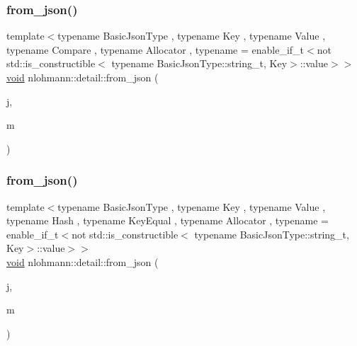 \subsubsection{\texorpdfstring{from\_json()}{from\_json()}\hspace{0.1cm}{\footnotesize\ttfamily [17/18]}}
{\footnotesize\ttfamily template$<$typename Basic\+Json\+Type , typename Key , typename Value , typename Compare , typename Allocator , typename  = enable\+\_\+if\+\_\+t$<$not std\+::is\+\_\+constructible$<$                                     typename Basic\+Json\+Type\+::string\+\_\+t, Key$>$\+::value$>$$>$ \\
\mbox{\hyperlink{namespacenlohmann_1_1detail_a59fca69799f6b9e366710cb9043aa77d}{void}} nlohmann\+::detail\+::from\+\_\+json (\begin{DoxyParamCaption}\item[{const Basic\+Json\+Type \&}]{j,  }\item[{std\+::map$<$ Key, Value, Compare, Allocator $>$ \&}]{m }\end{DoxyParamCaption})}

\mbox{\label{namespacenlohmann_1_1detail_aef5c8ea108f4d2b03fb4a635617510de}} 
\subsubsection{\texorpdfstring{from\_json()}{from\_json()}\hspace{0.1cm}{\footnotesize\ttfamily [18/18]}}
{\footnotesize\ttfamily template$<$typename Basic\+Json\+Type , typename Key , typename Value , typename Hash , typename Key\+Equal , typename Allocator , typename  = enable\+\_\+if\+\_\+t$<$not std\+::is\+\_\+constructible$<$                                     typename Basic\+Json\+Type\+::string\+\_\+t, Key$>$\+::value$>$$>$ \\
\mbox{\hyperlink{namespacenlohmann_1_1detail_a59fca69799f6b9e366710cb9043aa77d}{void}} nlohmann\+::detail\+::from\+\_\+json (\begin{DoxyParamCaption}\item[{const Basic\+Json\+Type \&}]{j,  }\item[{std\+::unordered\+\_\+map$<$ Key, Value, Hash, Key\+Equal, Allocator $>$ \&}]{m }\end{DoxyParamCaption})}


